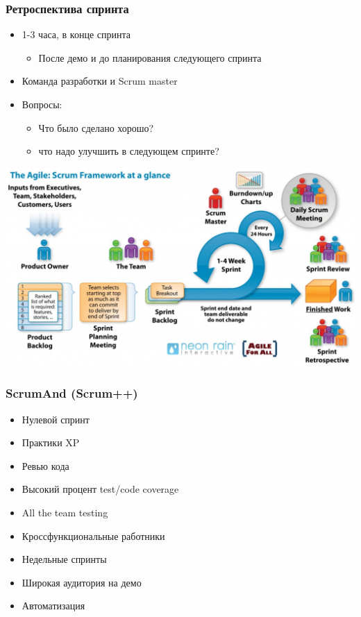 \documentclass{../../slides-style}
\begin{document}
    \begin{frame}
        \frametitle{Ретроспектива спринта}
        \begin{itemize}
            \item 1-3 часа, в конце спринта
            \begin{itemize}
                \item После демо и до планирования следующего спринта
            \end{itemize}
            \item Команда разработки и Scrum master
            \item Вопросы:
            \begin{itemize}
                \item Что было сделано хорошо?
                \item что надо улучшить в следующем спринте?
            \end{itemize}
        \end{itemize}
    \end{frame}

    \begin{frame}
        \begin{center}
            \includegraphics[width=\textwidth]{scrumProcess.png}
        \end{center}
    \end{frame}

    \begin{frame}
        \frametitle{ScrumAnd (Scrum++)}
        \begin{itemize}
            \item Нулевой спринт
            \item Практики XP
            \item Ревью кода
            \item Высокий процент test/code coverage 
            \item All the team testing
            \item Кроссфункциональные работники
            \item Недельные спринты
            \item Широкая аудитория на демо
            \item Автоматизация
        \end{itemize}
    \end{frame}
\end{document}
